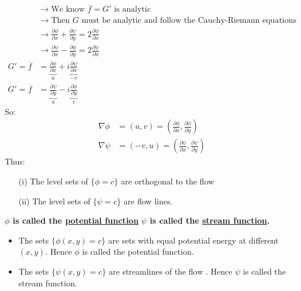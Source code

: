 \begin{corollary}
\begin{align*}
                          & \rightarrow \text{We know } \overline{f} = G' \text{ is analytic}                                                                                                                              \\
                          & \rightarrow \text{Then } G \text{ must be analytic and follow the Cauchy-Riemann equations}                                                                                                    \\
                          & \rightarrow \frac{\partial \phi}{\partial x} + \frac{\partial \psi}{\partial y} = 2\frac{\partial \phi}{\partial x}                                                                            \\
                          & \rightarrow \frac{\partial \psi}{\partial x} - \frac{\partial \phi}{\partial y} = 2\frac{\partial \psi}{\partial x}                                                                            \\
        G'= \overline{f}  & = \underbrace{\frac{\partial \phi}{\partial x}}_{u} + i\underbrace{\frac{\partial \psi}{\partial x}}_{-v}                                                                                      \\
        G' = \overline{f} & = \underbrace{\frac{\partial \psi}{\partial y}}_u - i\underbrace{\frac{\partial \phi}{\partial y}}_{v}
    \end{align*}
    So:
    \begin{align*}
        \nabla \phi & = (u,v) = \left(\frac{\partial \phi}{\partial x}, \frac{\partial \phi}{\partial y}\right)  \\
        \nabla \psi & = (-v,u) = \left(\frac{\partial \psi}{\partial x}, \frac{\partial \psi}{\partial y}\right)
    \end{align*}
    Thus:
    \begin{enumerate}
        \item[(i)] The level sets of $\{\phi = c\}$ are orthogonal to the flow
        \item[(ii)] The level sets of $\{\psi = c\}$ are flow lines.
    \end{enumerate}
    \textbf{$\phi$ is called the \underline{potential function}}
    \textbf{$\psi$ is called the \underline{stream function}.}
\end{corollary}

\begin{remark}
    \begin{itemize}
        \item[]
        \item The sets $\{\phi(x,y) = c\}$ are sets with equal potential energy at different $(x,y)$. Hence $\phi$ is called the potential function.
        \item The sets $\{\psi(x,y) = c\}$ are streamlines of the flow . Hence $\psi$ is called the stream function.
    \end{itemize}
\end{remark}

